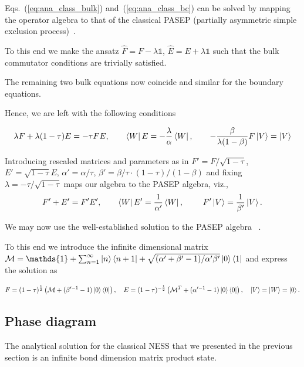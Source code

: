 \documentclass[aps,prl,twocolumn,groupedaddress,superscriptaddress,colorlinks,bookmarks=false,citecolor=darkspringgreen,linkcolor=darkolivegreen,urlcolor=navyblue]{revtex4-1}
\begin{document}
Eqs.~(\ref{eq:ana_class_bulk}) and~(\ref{eq:ana_class_bc}) can be solved by mapping the operator algebra to that of the classical PASEP (partially asymmetric simple exclusion process)~\cite{Blythe07}.

To this end we make the ansatz $\hat{F} = F - \lambda\mathds{1}$, $\hat{E} = E + \lambda\mathds{1}$ such that the bulk commutator conditions are trivially satisfied.

The remaining two bulk equations now coincide and similar for the boundary equations.

Hence, we are left with the following conditions


 \begin{align}
     \lambda F + \lambda (1-\tau) E = - \tau FE, \qquad
     \bra{W} E = -\frac{\lambda}{\alpha} \bra{W}, \qquad
      -\frac{\beta}{\lambda(1-\beta)} F \ket{V} = \ket{V}
 \end{align}


 Introducing rescaled matrices and parameters as in
 $F' = F/\sqrt{1-\tau}$, $E' = \sqrt{1-\tau} E$, $\alpha' = \alpha/\tau$, $\beta' = \beta/\tau \cdot (1-\tau)/ (1-\beta)$
and fixing $\lambda = -\tau/\sqrt{1-\tau}$ maps our algebra to the PASEP algebra, viz.,
 \begin{align}
    F' +  E' =  F'E', \qquad
    \bra{W} E' = \frac{1}{\alpha'} \bra{W},\ \qquad
     F' \ket{V} = \frac{1}{\beta'} \ket{V} .
 \end{align}


We may now use the well-established solution to the PASEP algebra ~\cite{Blythe07}.

To this end we introduce the infinite dimensional matrix ${\cal M} = \mathds{1} + \sum_{n=1}^\infty \ket{n}\bra{n+1} + \sqrt{(\alpha' + \beta' - 1)/\alpha' \beta'} \ket{0}\bra{1}$ and express the solution as


\begin{align}\label{discrete_DE}
F = (1-\tau)^{\frac{1}{2}} \left( {\cal M} + (\beta'^{-1} - 1) \ket{0}\bra{0}   \right), \quad
E = (1-\tau)^{-\frac{1}{2}} \left( {\cal M}^T + (\alpha'^{-1} -1) \ket{0}\bra{0}  \right), \quad
\ket{V} = \ket{W} = \ket{0}.
\end{align}



\subsection{Phase diagram}
The analytical solution for the classical NESS that we presented in the previous section is an infinite bond dimension matrix product state.
\end{document}
